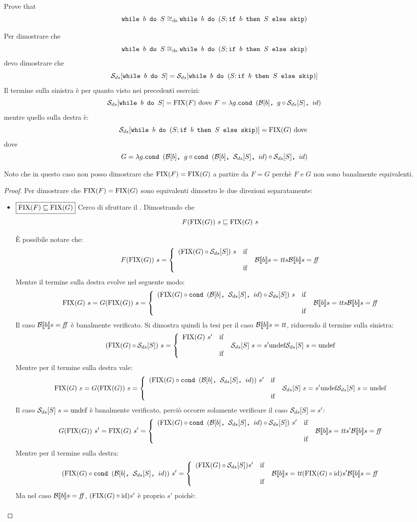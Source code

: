 {Prove that
$$
	\wbS{b}{S} \eqDS \wbS{b}{(S; \ifABC{b}{S}{\skipForFriends})}
$$
}
{
Per dimostrare che 
$$
	\wbS{b}{S} \eqDS \wbS{b}{(S; \ifABC{b}{S}{\skipForFriends})}
$$	
devo dimostrare che
$$
\dsCtxt{\wbS{b}{S}} = \dsCtxt{\wbS{b}{(S; \ifABC{b}{S}{\skipForFriends})}}
$$
Il termine sulla sinistra è per quanto visto nei precedenti esercizi:
$$
\dsCtxt{\wbS{b}{S}} = \fixp{F} \text{ dove } F = \lambda g. \cond{b}{g \circ \dsCtxt{S}}{id}
$$
mentre quello sulla destra è:
$$
\dsCtxt{\wbS{b}{(S; \ifABC{b}{S}{\skipForFriends})}} = \fixp{G} \text{ dove } 
$$
dove 
$$
G = \lambda g. \cond{b}{g \circ \cond{b}{\dsCtxt{S}}{id} \circ \dsCtxt{S}}{id} 
$$

Noto che in questo caso non posso dimostrare che $\fixp{F} = \fixp{G}$ a partire da $F = G$ perchè
$F$ e $G$ non sono banalmente equivalenti.

\begin{proof}
Per dimostrare che $\fixp{F} = \fixp{G}$ sono equivalenti dimostro le due direzioni separatamente:
\begin{itemize}
  \item $\boxed{\fixp{F} \sqsubseteq \fixp{G}}$
  Cerco di sfruttare il \FPIL. Dimostrando che
  $$
  F(\fixp{G})\ s \sqsubseteq \fixp{G}\ s
  $$

  È possibile notare che:
  $$
  F(\fixp{G})\ s =
    \caseFun{(\fixp{G} \circ \dsCtxt{S})\ s}
            {\B{b} = \semtrue}
            {s}
            {\B{b} = \semfalse}
  $$
  Mentre il termine sulla destra evolve nel seguente modo:
  $$
  \fixp{G}\ s= G(\fixp{G})\ s =
    \caseFun{(\fixp{G} \circ \cond{b}{\dsCtxt{S}}{id} \circ \dsCtxt{S})\ s}
            {\B{b} = \semtrue}
            {s}
            {\B{b} = \semfalse}
  $$
  Il caso $\B{b} = \semfalse$ è banalmente verificato. Si dimostra quindi la
  tesi per il caso $\B{b} = \semtrue$, riducendo il termine sulla sinistra:
  $$
  (\fixp{G} \circ \dsCtxt{S})\ s =
    \caseFun{\fixp{G}\ s'}
            {\dsCtxt{S}\ s = s'}
            {\undefDS}
            {\dsCtxt{S}\ s = \undefDS}
  $$
  Mentre per il termine sulla destra vale:
  $$
  \fixp{G}\ s= G(\fixp{G})\ s =
    \caseFun{(\fixp{G} \circ \cond{b}{\dsCtxt{S}}{id})\ s'}
            {\dsCtxt{S}\ s = s'}
            {\undefDS}
            {\dsCtxt{S}\ s = \undefDS}
  $$
  Il caso $\dsCtxt{S}\ s = \undefDS$ è banalmente verificato, perciò occorre
  solamente verificare il caso $\dsCtxt{S} = s'$:
  $$
  G(\fixp{G})\ s' = \fixp{G}\ s' =
    \caseFun{(\fixp{G} \circ \cond{b}{\dsCtxt{S}}{id} \circ \dsCtxt{S})\ s'}
            {\B{b} = \semtrue}
            {s'}
            {\B{b} = \semfalse}
  $$
  Mentre per il termine sulla destra:
  $$
  (\fixp{G} \circ \cond{b}{\dsCtxt{S}}{id})\ s' =
    \caseFun{(\fixp{G} \circ \dsCtxt{S}) s'}
            {\B{b} = \semtrue}
            {(\fixp{G} \circ \idDS) s'}
            {\B{b} = \semfalse}
  $$
  Ma nel caso $\B{b} = \semfalse$, $(\fixp{G} \circ \idDS) s'$ è proprio
  $s'$ poichè:
  $$
  \begin{array}{lr}
  \end{array}
  $$


\end{itemize}
\end{proof}}
